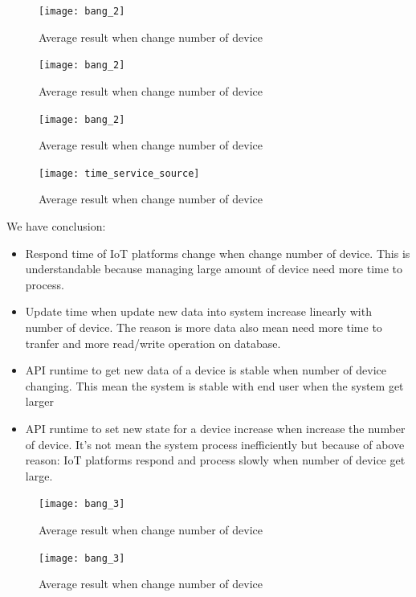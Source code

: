 \documentclass[runningheads,a4paper]{llncs}
\begin{document}
\begin{figure}[H]
\centering
\texttt{[image: bang\_2]} 
\caption{Average result when change number of device}
\end{figure} 

\begin{figure}[H]
\centering
\texttt{[image: bang\_2]} 
\caption{Average result when change number of device}
\end{figure} 

\begin{figure}[H]
\centering
\texttt{[image: bang\_2]} 
\caption{Average result when change number of device}
\end{figure} 




\begin{figure}
\centering
\texttt{[image: time\_service\_source]} 
\caption{Average result when change number of device}
\end{figure} 


We have conclusion:

\begin{itemize}
\item Respond time of IoT platforms change when change number of device. This is understandable because managing large amount of device need more time to process.
\item Update time when update new data into system increase linearly with number of device. 	The reason is more data also mean need more time to tranfer and more read/write operation on database.
\item API runtime to get new data of a device is stable when number of device changing. This mean the system is stable with end user when the system get larger
\item API runtime to set new state for a device increase when increase the number of device. It's not mean the system process inefficiently but because of above reason: IoT platforms respond and process slowly when number of device get large.
\end{itemize}



\begin{figure}[H]
\centering
\texttt{[image: bang\_3]} 
\caption{Average result when change number of device}
\end{figure} 

\begin{figure}[H]
\centering
\texttt{[image: bang\_3]} 
\caption{Average result when change number of device}
\end{figure} 
\end{document}
